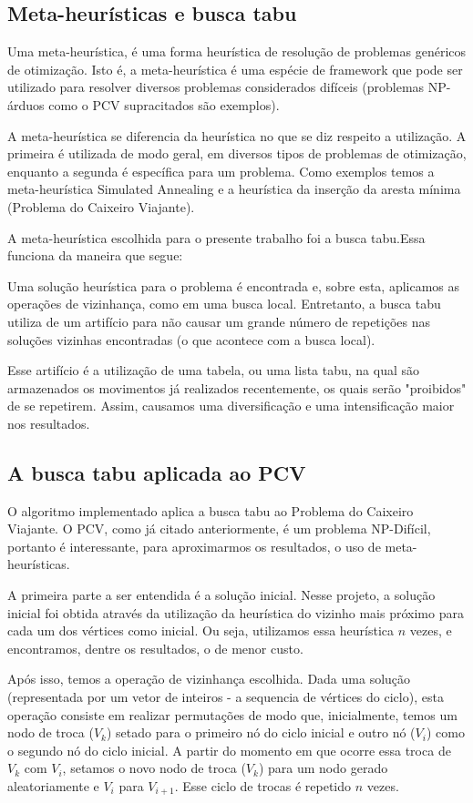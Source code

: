 \subsection{Meta-heurísticas e busca tabu}
Uma meta-heurística, é uma forma heurística de resolução de problemas genéricos de otimização\cite{metaheuristicas2009}. Isto é, a meta-heurística é uma espécie de framework que pode ser utilizado para resolver diversos problemas considerados difíceis (problemas NP-árduos como o PCV supracitados são exemplos).

A meta-heurística se diferencia da heurística no que se diz respeito a utilização. A primeira é utilizada de modo geral, em diversos tipos de problemas de otimização, enquanto a segunda é específica para um problema. Como exemplos temos a meta-heurística Simulated Annealing e a heurística da inserção da aresta mínima (Problema do Caixeiro Viajante).

A meta-heurística escolhida para o presente trabalho foi a busca tabu.Essa funciona da maneira que segue:

Uma solução heurística para o problema é encontrada e, sobre esta, aplicamos as operações de vizinhança, como em uma busca local. Entretanto, a busca tabu utiliza de um artifício para não causar um grande número de repetições nas soluções vizinhas encontradas (o que acontece com a busca local).

Esse artifício é a utilização de uma tabela, ou uma lista tabu, na qual são armazenados os movimentos já realizados recentemente, os quais serão "proibidos" de se repetirem. Assim, causamos uma diversificação e uma intensificação maior nos resultados.

\subsection{A busca tabu aplicada ao PCV}


O algoritmo implementado aplica a busca tabu ao Problema do Caixeiro Viajante. O PCV, como já citado anteriormente, é um problema NP-Difícil, portanto é interessante, para aproximarmos os resultados, o uso de meta-heurísticas.

A primeira parte a ser entendida é a solução inicial. Nesse projeto, a solução inicial foi obtida através da utilização da heurística do vizinho mais próximo para cada um dos vértices como inicial. Ou seja, utilizamos essa heurística $n$ vezes, e encontramos, dentre os resultados, o de menor custo.

Após isso, temos a operação de vizinhança escolhida. Dada uma solução (representada por um vetor de inteiros - a sequencia de vértices do ciclo), esta operação consiste em realizar permutações de modo que, inicialmente, temos um nodo de troca ($V_k$) setado para o primeiro nó do ciclo inicial e outro nó ($V_i$) como o segundo nó do ciclo inicial. A partir do momento em que ocorre essa troca de $V_k$ com $V_i$, setamos o novo nodo de troca ($V_k$) para um nodo gerado aleatoriamente e $V_i$ para $V_{i+1}$. Esse ciclo de trocas é repetido $n$ vezes.

